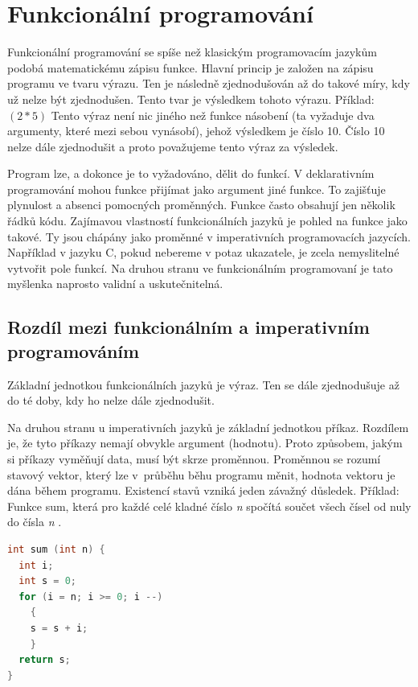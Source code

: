 \documentclass[12pt,a4paper]{report}
\begin{document}
\section{Funkcionální programování}
Funkcionální programování se spíše než klasickým programovacím jazykům podobá matematickému zápisu funkce. Hlavní princip je založen na zápisu programu ve tvaru výrazu. Ten je následně zjednodušován až do takové míry, kdy už nelze být zjednodušen. Tento tvar je výsledkem tohoto výrazu. \newline
Příklad: \newline
$(2 * 5)$ Tento výraz není nic jiného než funkce násobení (ta vyžaduje dva argumenty, které mezi sebou vynásobí), jehož výsledkem je číslo 10. Číslo 10 nelze dále zjednodušit a proto považujeme tento výraz za výsledek. 

Program lze, a dokonce je to vyžadováno, dělit do funkcí. V deklarativním programování mohou funkce přijímat jako argument jiné funkce. To zajišťuje plynulost a absenci pomocných proměnných. Funkce často obsahují jen několik řádků kódu. Zajímavou vlastností funkcionálních jazyků je pohled na funkce jako takové. Ty jsou chápány jako proměnné v imperativních programovacích jazycích. Například v jazyku C, pokud nebereme v potaz ukazatele, je zcela nemyslitelné vytvořit pole funkcí. Na druhou stranu ve funkcionálním programovaní je tato myšlenka naprosto validní a uskutečnitelná.  

\subsection{Rozdíl mezi funkcionálním a imperativním programováním}
Základní jednotkou funkcionálních jazyků je výraz. Ten se dále zjednodušuje až do té doby, kdy ho nelze dále zjednodušit. 

Na druhou stranu u imperativních jazyků je základní jednotkou příkaz. Rozdílem je, že tyto příkazy nemají obvykle argument (hodnotu). Proto způsobem, jakým si příkazy vyměňují data, musí být skrze proměnnou. Proměnnou se rozumí stavový vektor, který lze v~průběhu běhu programu měnit, hodnota vektoru je dána během programu. Existencí stavů vzniká jeden závažný důsledek.
\newline
\newline
Příklad:\newline
Funkce sum, která pro každé celé kladné číslo \textit{n} spočítá součet všech čísel od nuly do čísla \textit{n} .\newline
\begin{lstlisting}[caption={jazyk C}, captionpos=b, language = C]	
int sum (int n) {
  int i;
  int s = 0;
  for (i = n; i >= 0; i --)
    {
    s = s + i;
    }   
  return s;
}
\end{lstlisting}
\end{document}

